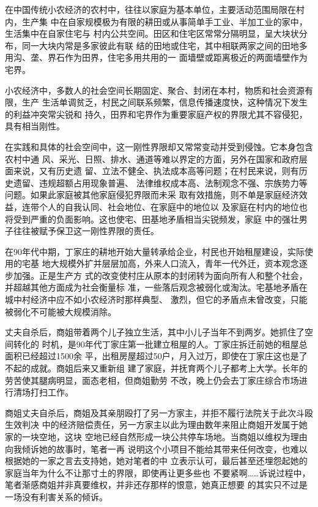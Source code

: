 在中国传统小农经济的农村中，往往以家庭为基本单位，主要活动范围局限在村内，生产集
中在自家规模极为有限的耕田或从事简单手工业、半加工业的家中，生活集中在自家住宅与
村内公共空间。田区和住宅区常常分隔明显，呈大块状分布，同一大块内常是多家彼此有联
结的田地或住宅，其中相联两家之间的田地多用沟、垄、界石作为田界，住宅多用共用的一
面墙壁或距离极近的两面墙壁作为宅界。

小农经济中，多数人的社会空间长期固定、聚合、封闭在本村，物质和社会资源有限，生产
生活单调贫乏，村民之间联系频繁，信息传播速度快，这种情况下发生的利益冲突常尖锐和
持久，田界和宅界作为重要家庭产权的界限尤其不容侵犯，具有相当刚性。

在实践和具体的社会空间中，这一刚性界限却又常常变动并受到侵蚀。它本身包含农村中通
风、采光、日照、排水、通道等难以界定的方面，另外在国家和政府层面来说，又有历史遗
留、立法不健全、执法成本高等问题；在村民来说，则有历史遗留、违规超额占用现象普遍、
法律维权成本高、法制观念不强、宗族势力等问题。如果此家庭被其他家庭侵犯界限而未采
取有效措施，则不单是家庭经济效益，连带个人的自我认同、社会地位、在家庭中的地位以
及家庭在村内的地位也将受到严重的负面影响。这也使宅、田基地矛盾相当尖锐频发，家庭
中的强壮男子往往被赋予保卫这一刚性界限的责任。

在90年代中期，丁家庄的耕地开始大量转承给企业，村民也开始租屋建设，实际使用的宅基
地大规模外扩并层层加高，外来人口流入，青年一代外迁，资本观念逐步加强。正是生产方
式的改变使村庄从原本的封闭转为面向所有人和整个社会，并超越其他方面成为社会衡量标
准，一些落后观念被弱化或淘汰。宅基地矛盾在城中村经济中应不如小农经济时那样典型、
激烈，但它的矛盾点未曾改变，只能被弱化不可能被大规模消除。

丈夫自杀后，商姐带着两个儿子独立生活，其中小儿子当年不到两岁。她抓住了空间转化的
时机，是90年代丁家庄第一批建立租屋的人。丁家庄拆迁前她的租屋总面积已经超过1500余
平，出租房屋超过50户，月入过万，即使在丁家庄这也是了不起的成就。商姐后来又重新组
建了家庭，并抚育两个儿子都考上大学。长年的劳苦使其腿病明显，面态老相，但商姐勤劳
不改，晚上仍会去丁家庄综合市场进行清场打扫工作。

商姐丈夫自杀后，商姐及其亲朋殴打了另一方家主，并拒不履行法院关于此次斗殴生效判决
中的经济赔偿责任，另一方家主以此为理由数年来阻止商姐开发属于她家的一块空地，这块
空地已经自然形成一块公共停车场地。当商姐以维权为理由向我倾诉她的故事时，笔者一再
说明这个小项目不能给其带来任何改变，也难以根据她的一家之言去支持她，她对笔者的中
立表示认可，最后甚至还埋怨起她的家庭当年为什么不让那寸土的界限，即使再让更多些也
不要紧啊……诉说过程中，笔者渐感商姐并非真要维权，并非还存那样的恨意，她真正想要
的其实只不过是一场没有利害关系的倾诉。

